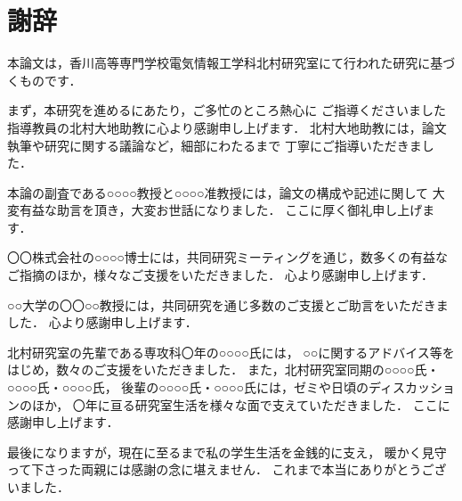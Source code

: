 \chapter{謝辞}

本論文は，香川高等専門学校電気情報工学科北村研究室にて行われた研究に基づくものです．

まず，本研究を進めるにあたり，ご多忙のところ熱心に
ご指導くださいました指導教員の北村大地助教に心より感謝申し上げます．
北村大地助教には，論文執筆や研究に関する議論など，細部にわたるまで
丁寧にご指導いただきました．

本論の副査である○○○○教授と○○○○准教授には，論文の構成や記述に関して
大変有益な助言を頂き，大変お世話になりました．
ここに厚く御礼申し上げます．

〇〇株式会社の○○○○博士には，共同研究ミーティングを通じ，数多くの有益な
ご指摘のほか，様々なご支援をいただきました．
心より感謝申し上げます．

○○大学の〇〇○○教授には，共同研究を通じ多数のご支援とご助言をいただきました．
心より感謝申し上げます．

北村研究室の先輩である専攻科〇年の○○○○氏には，
○○に関するアドバイス等をはじめ，数々のご支援をいただきました．
また，北村研究室同期の○○○○氏・○○○○氏・○○○○氏，
後輩の○○○○氏・○○○○氏には，ゼミや日頃のディスカッションのほか，
〇年に亘る研究室生活を様々な面で支えていただきました．
ここに感謝申し上げます．

最後になりますが，現在に至るまで私の学生生活を金銭的に支え，
暖かく見守って下さった両親には感謝の念に堪えません．
これまで本当にありがとうございました．
